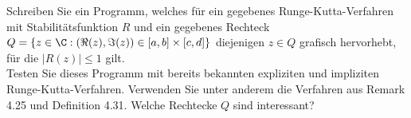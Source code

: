 \begin{exercise}
Schreiben Sie ein Programm, welches für ein gegebenes Runge-Kutta-Verfahren
mit Stabilitätsfunktion $R$ und ein gegebenes Rechteck $Q = \{ z \in \C:
(\Re(z),\Im(z)) \in [a,b] \times [c,d]\}$ diejenigen $z \in Q$ grafisch
hervorhebt, für die $|R(z)| \leq 1$ gilt. \\
Testen Sie dieses Programm mit bereits bekannten expliziten und impliziten
Runge-Kutta-Verfahren. Verwenden Sie unter anderem die Verfahren aus Remark 4.25
und Definition 4.31. Welche Rechtecke $Q$ sind interessant?
\end{exercise}
\begin{solution}

\end{solution}
